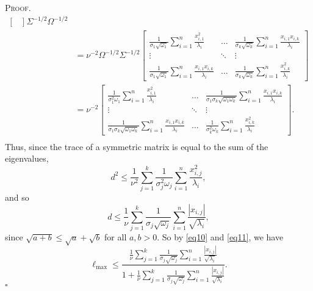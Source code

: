 \documentclass[12pt]{article}
\newcounter{ProofCounter}
\newenvironment{Proof}{\stepcounter{ProofCounter}\textsc{Proof.}}{\hfill$\square$}
\begin{document}
\begin{Proof}
\begin{align*}
\begin{bmatrix}
    \end{bmatrix} \Sigma^{-1/2} \Omega^{-1/2} \\
    & = \nu^{-2} \Omega^{-1/2}\Sigma^{-1/2} \begin{bmatrix}
      \frac{1}{\sigma_1 \sqrt{\omega_1}}\sum_{i=1}^{n}\frac{x_{i,1}^2}{\lambda_i} & \dots & \frac{1}{\sigma_k\sqrt{\omega_k}}\sum_{i=1}^{n}\frac{ x_{i,1}x_{i,k}}{\lambda_i} \\
      \vdots & \ddots & \vdots \\
      \frac{1}{\sigma_1 \sqrt{\omega_1}}\sum_{i=1}^{n} \frac{x_{i,1}x_{i,k}}{\lambda_i} & \dots & \frac{1}{\sigma_k\sqrt{\omega_k}}\sum_{i=1}^{n}\frac{ x_{i,k}^2}{\lambda_i}
    \end{bmatrix}  \\
    & = \nu^{-2} \begin{bmatrix}
      \frac{1}{\sigma_1^2 \omega_1}\sum_{i=1}^{n}\frac{x_{i,1}^2}{\lambda_i} & \dots & \frac{1}{\sigma_1\sigma_k\sqrt{\omega_1\omega_k}}\sum_{i=1}^{n}\frac{ x_{i,1}x_{i,k}}{\lambda_i} \\
      \vdots & \ddots & \vdots \\
      \frac{1}{\sigma_1\sigma_k \sqrt{\omega_1\omega_k}}\sum_{i=1}^{n} \frac{x_{i,1}x_{i,k}}{\lambda_i} & \dots & \frac{1}{\sigma_k^2\omega_k}\sum_{i=1}^{n}\frac{ x_{i,k}^2}{\lambda_i}
    \end{bmatrix}.  \\
  \end{align*}
  Thus, since the trace of a symmetric matrix is equal to the sum of the eigenvalues, 
  \begin{equation*}
    d^2 \leq \frac{1}{\nu^{2}} \sum_{j=1}^{k} \frac{1}{\sigma_j^2 \omega_j} \sum_{i=1}^{n} \frac{x_{i,j}^2}{\lambda_i},
  \end{equation*}
  and so 
  \begin{equation}
    d \leq \frac{1}{\nu} \sum_{j=1}^{k} \frac{1}{\sigma_j \sqrt{\omega_j}} \sum_{i=1}^{n} \frac{|x_{i,j}|}{\sqrt{\lambda_i}},
    \label{eq11}
  \end{equation}
  since $\sqrt{a + b} \leq \sqrt{a} + \sqrt{b}$ for all $a, b > 0$. So by \eqref{eq10} and \eqref{eq11}, we have
  \begin{equation}
    \ell_{\max} \leq \frac{ \frac{1}{\nu} \sum_{j=1}^{k} \frac{1}{\sigma_j \sqrt{\omega_j}} \sum_{i=1}^{n} \frac{|x_{i,j}|}{\sqrt{\lambda_i}} }{ 1 + 
    \frac{1}{\nu} \sum_{j=1}^{k} \frac{1}{\sigma_j \sqrt{\omega_j}} \sum_{i=1}^{n} \frac{|x_{i,j}|}{\sqrt{\lambda_i}} }.
    \label{eq12}
  \end{equation}
\end{Proof}
\end{document}
